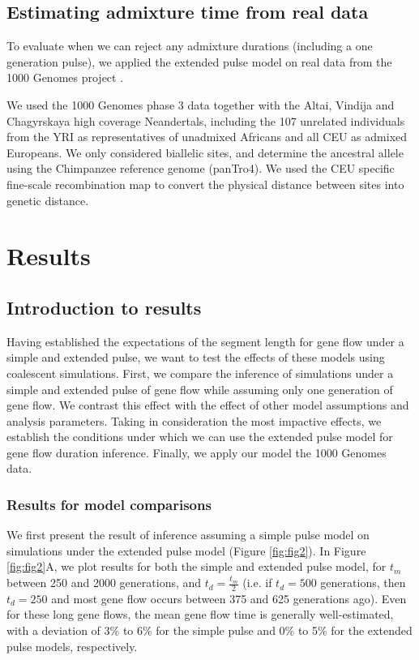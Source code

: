 \documentclass[]{article}
\begin{document}
\subsection{Estimating admixture time from real data}\label{Estimating admixture time from real data}
To evaluate when we can reject any admixture durations (including a one generation pulse), we applied the extended pulse model on real data from the 1000 Genomes project \cite{the_1000_genomes_project_consortium_global_2015}.

We used the 1000 Genomes phase 3 data together with the Altai, Vindija and Chagyrskaya high coverage Neandertals, including the 107 unrelated individuals from the YRI as representatives of unadmixed Africans and all CEU as admixed Europeans. We only considered biallelic sites, and determine the ancestral allele using  the Chimpanzee reference genome (panTro4). We used the CEU specific fine-scale recombination map \citep{spence_inference_2019} to convert the physical distance between sites into genetic distance. 


\section{Results}\label{results}

\subsection{Introduction to results}\label{introduction to result}



Having established the expectations of the segment length for gene flow under a simple and extended pulse, we want to test the effects of these models using coalescent simulations. First, we compare the inference of simulations under a simple and extended pulse of gene flow while assuming only one generation of gene flow. We contrast this effect with the effect of other model assumptions and analysis parameters. Taking in consideration the most impactive effects, we establish the conditions under which we can use the extended pulse model for gene flow duration inference. Finally, we apply our model the 1000 Genomes data.



\subsubsection{Results for model comparisons}
We first present the result of inference assuming a simple pulse model on simulations under the extended pulse model (Figure \ref{fig:fig2}).
In Figure \ref{fig:fig2}A, we plot results for both the simple and extended pulse model, for $t_m$ between 250 and 2000 generations, and $t_d = \frac{t_m}{2}$  (i.e. if $t_d= 500$ generations, then $t_d = 250$ and most gene flow occurs between  375 and 625
generations ago). Even for these long gene flows, the mean gene flow time is generally well-estimated, with a deviation of 3\% to 6\% for the simple pulse and 0\% to 5\% for
the extended pulse models, respectively.
\end{document}

